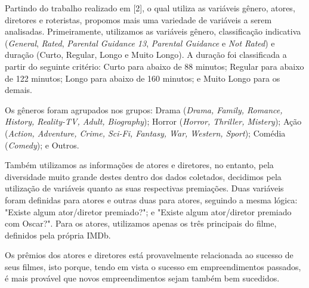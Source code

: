 \documentclass[twoside]{article}
\begin{document}
\begin{multicols}{2}
Partindo do trabalho realizado em [2], o qual utiliza as variáveis gênero, atores, diretores e roteristas, propomos mais uma variedade de variáveis a serem analisadas. Primeiramente, utilizamos as variáveis gênero, classificação indicativa (\textit{General}, \textit{Rated}, \textit{Parental Guidance 13}, \textit{Parental Guidance} e \textit{Not Rated}) e duração (Curto, Regular, Longo e Muito Longo). A duração foi classificada a partir do seguinte critério: Curto para abaixo de 88 minutos; Regular para abaixo de 122 minutos; Longo para abaixo de 160 minutos; e Muito Longo para os demais.

Os gêneros foram agrupados nos grupos: Drama (\textit{Drama, Family, Romance, History, Reality-TV, Adult, Biography}); Horror (\textit{Horror, Thriller, Mistery}); Ação (\textit{Action, Adventure, Crime, Sci-Fi, Fantasy, War, Western, Sport}); Comédia (\textit{Comedy}); e Outros.

Também utilizamos as informações de atores e diretores, no entanto, pela diversidade muito grande destes dentro dos dados coletados, decidimos pela utilização de variáveis quanto as suas respectivas premiações. Duas variáveis foram definidas para atores e outras duas para atores, seguindo a mesma lógica: "Existe algum ator/diretor premiado?"; e "Existe algum ator/diretor premiado com Oscar?". Para os atores, utilizamos apenas os três principais do filme, definidos pela própria IMDb.

Os prêmios dos atores e diretores está provavelmente relacionada ao sucesso de seus filmes, isto porque, tendo em vista o sucesso em empreendimentos passados, é mais provável que novos empreendimentos sejam também bem sucedidos.


\end{multicols}
\end{document}
